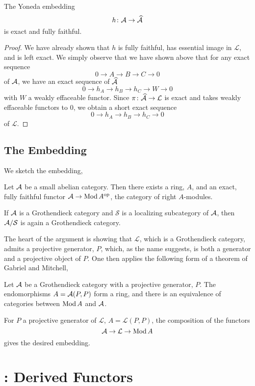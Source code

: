 \documentclass[reqno, 12pt]{amsart}
\begin{document}
\begin{corollary}
  The Yoneda embedding
  $$h \colon \mathcal{A} \to \widehat{\mathcal{A}}$$
  is exact and fully faithful.
\end{corollary}
\begin{proof}
  We have already shown that $h$ is fully faithful, has essential image in $\mathcal{L}$, and is left exact.
  We simply observe that we have shown above that for any exact sequence
  $$0 \to A \to B \to C \to 0$$
  of $\mathcal{A}$, we have an exact sequence of $\widehat{\mathcal{A}}$
  $$0 \to h_A \to h_B \to h_C \to W \to 0$$
  with $W$ a weakly effaceable functor.
  Since $\pi \colon \widehat{\mathcal{A}} \to \mathcal{L}$ is exact and takes weakly effaceable functors to 0, we obtain a short exact sequence
  $$0 \to h_A \to h_B \to h_C \to 0$$
  of $\mathcal{L}$.
\end{proof}
\subsection{The Embedding}

We sketch the embedding,
\begin{theorem}[Mitchell]
  Let $\mathcal{A}$ be a small abelian category.
  Then there exists a ring, $A$, and an exact, fully faithful functor $\mathcal{A} \to \operatorname{Mod}A^{\operatorname{op}}$, the category of right $A$-modules.
\end{theorem}

\begin{theorem}
  If $\mathcal{A}$ is a Grothendieck category and $\mathcal{S}$ is a localizing subcategory of $\mathcal{A}$, then $\mathcal{A}/\mathcal{S}$ is again a Grothendieck category.
\end{theorem}

The heart of the argument is showing that $\mathcal{L}$, which is a Grothendieck category, admits a projective generator, $P$, which, as the name suggests, is both a generator and a projective object of $P$.
One then applies the following form of a theorem of Gabriel and Mitchell, 
\begin{theorem}
  Let $\mathcal{A}$ be a Grothendieck category with a projective generator, $P$.
  The endomorphisms $A = \mathcal{A}(P,P)$ form a ring, and there is an equivalence of categories between $\operatorname{Mod}A$ and $\mathcal{A}$.
\end{theorem}

For $P$ a projective generator of $\mathcal{L}$, $A = \mathcal{L}(P,P)$, the composition of the functors
$$\mathcal{A} \to \mathcal{L} \to \operatorname{Mod}A$$
gives the desired embedding.
\section{\cite[Section 2.1]{Weibel95}: Derived Functors}
\end{document}
